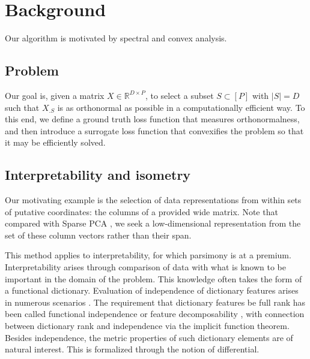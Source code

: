 \section{Background}

Our algorithm is motivated by spectral and convex analysis.

\subsection{Problem}

Our goal is, given a matrix $ X \in \mathbb R^{D \times P}$, to select a subset $ S \subset [P]$ with $| S| = D$ such that $X_{.  S}$ is as orthonormal as possible in a computationally efficient way.
To this end, we define a ground truth loss function that measures orthonormalness, and then introduce a surrogate loss function that convexifies the problem so that it may be efficiently solved.

\subsection{Interpretability and isometry}

Our motivating example is the selection of data representations from within sets of putative coordinates: the columns of a provided wide matrix.
Note that compared with Sparse PCA \citep{Dey2017-mx, Bertsimas2022-qo, Bertsimas2022-dv}, we seek a low-dimensional representation from the set of these column vectors rather than their span.

This method applies to interpretability, for which parsimony is at a premium.
Interpretability arises through comparison of data with what is known to be important in the domain of the problem.
This knowledge often takes the form of a functional dictionary.
Evaluation of independence of dictionary features arises in numerous scenarios \citep{Chen2019-km, Koelle2022-ju, He2023-ch}.
The requirement that dictionary features be full rank has been called functional independence \citep{Koelle2022-ju} or feature decomposability \citep{templeton2024scaling}, with connection between dictionary rank and independence via the implicit function theorem.
Besides independence, the metric properties of such dictionary elements are of natural interest.
This is formalized through the notion of differential.


